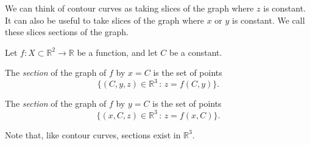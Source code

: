 \documentclass{ximera}
\begin{document}
We can think of contour curves as taking slices of the graph where $z$ is constant. It can also be useful to take slices of the graph where $x$ or $y$ is constant. We call these slices sections of the graph.

\begin{definition}
Let $f:X\subset\mathbb{R}^2\rightarrow\mathbb{R}$ be a function, and let $C$ be a constant.

The \emph{section} of the graph of $f$ by $x=C$ is the set of points 
\[
\{(C,y,z)\in\mathbb{R}^3\,:\,z = f(C,y)\}.
\]

The \emph{section} of the graph of $f$ by $y=C$ is the set of points 
\[
\{(x,C,z)\in\mathbb{R}^3\,:\,z = f(x,C)\}.
\]
\end{definition}

Note that, like contour curves, sections exist in $\mathbb{R}^3$.
\end{document}
